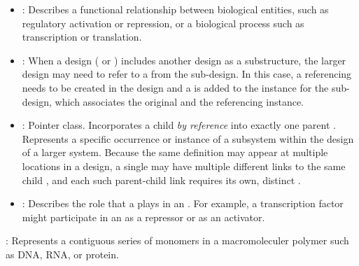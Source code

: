 \begin{description}
\begin{itemize}
\item \emph{}:
Describes a functional relationship between biological entities, such as regulatory activation or repression, or a biological process such as transcription or translation.

\item \emph{}:
When a design ( or ) includes another design as a substructure, the larger design may need to refer to a  from the sub-design.
In this case, a referencing  needs to be created in the design and a  is added to the instance for the sub-design, which associates the original and the referencing instance.

\item \emph{}:
Pointer class. Incorporates a child  \textit{by reference} into exactly one parent . Represents a specific occurrence or instance of a subsystem within the design of a larger system. Because the same definition may appear at multiple locations in a design, a single  may have multiple different links to the same child , and each such parent-child link requires its own, distinct .

\item \emph{}:
Describes the role that a  plays in an .
For example, a transcription factor might participate in an  as a repressor or as an activator.

\end{itemize}

\item \emph{}:
Represents a contiguous series of monomers in a macromoleculer polymer such as DNA, RNA, or protein. 

\end{description}
